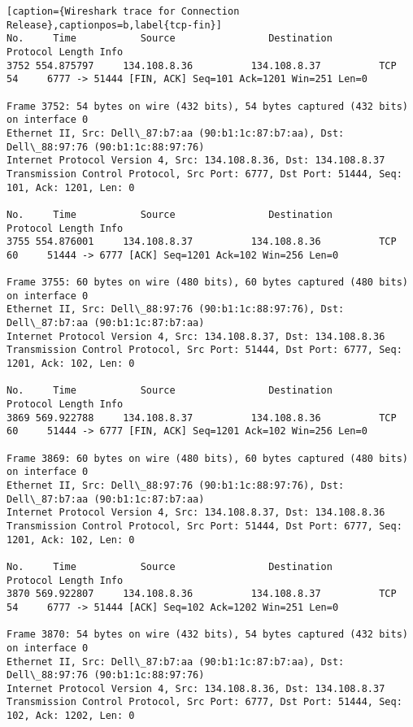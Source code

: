 \begin{lstlisting}[caption={Wireshark trace for Connection Release},captionpos=b,label{tcp-fin}]
No.     Time           Source                Destination           Protocol Length Info
3752 554.875797     134.108.8.36          134.108.8.37          TCP      54     6777 -> 51444 [FIN, ACK] Seq=101 Ack=1201 Win=251 Len=0

Frame 3752: 54 bytes on wire (432 bits), 54 bytes captured (432 bits) on interface 0
Ethernet II, Src: Dell\_87:b7:aa (90:b1:1c:87:b7:aa), Dst: Dell\_88:97:76 (90:b1:1c:88:97:76)
Internet Protocol Version 4, Src: 134.108.8.36, Dst: 134.108.8.37
Transmission Control Protocol, Src Port: 6777, Dst Port: 51444, Seq: 101, Ack: 1201, Len: 0

No.     Time           Source                Destination           Protocol Length Info
3755 554.876001     134.108.8.37          134.108.8.36          TCP      60     51444 -> 6777 [ACK] Seq=1201 Ack=102 Win=256 Len=0

Frame 3755: 60 bytes on wire (480 bits), 60 bytes captured (480 bits) on interface 0
Ethernet II, Src: Dell\_88:97:76 (90:b1:1c:88:97:76), Dst: Dell\_87:b7:aa (90:b1:1c:87:b7:aa)
Internet Protocol Version 4, Src: 134.108.8.37, Dst: 134.108.8.36
Transmission Control Protocol, Src Port: 51444, Dst Port: 6777, Seq: 1201, Ack: 102, Len: 0

No.     Time           Source                Destination           Protocol Length Info
3869 569.922788     134.108.8.37          134.108.8.36          TCP      60     51444 -> 6777 [FIN, ACK] Seq=1201 Ack=102 Win=256 Len=0

Frame 3869: 60 bytes on wire (480 bits), 60 bytes captured (480 bits) on interface 0
Ethernet II, Src: Dell\_88:97:76 (90:b1:1c:88:97:76), Dst: Dell\_87:b7:aa (90:b1:1c:87:b7:aa)
Internet Protocol Version 4, Src: 134.108.8.37, Dst: 134.108.8.36
Transmission Control Protocol, Src Port: 51444, Dst Port: 6777, Seq: 1201, Ack: 102, Len: 0

No.     Time           Source                Destination           Protocol Length Info
3870 569.922807     134.108.8.36          134.108.8.37          TCP      54     6777 -> 51444 [ACK] Seq=102 Ack=1202 Win=251 Len=0

Frame 3870: 54 bytes on wire (432 bits), 54 bytes captured (432 bits) on interface 0
Ethernet II, Src: Dell\_87:b7:aa (90:b1:1c:87:b7:aa), Dst: Dell\_88:97:76 (90:b1:1c:88:97:76)
Internet Protocol Version 4, Src: 134.108.8.36, Dst: 134.108.8.37
Transmission Control Protocol, Src Port: 6777, Dst Port: 51444, Seq: 102, Ack: 1202, Len: 0

\end{lstlisting}

